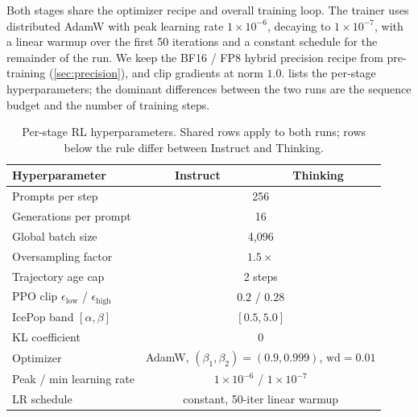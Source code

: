 \documentclass[11pt,a4paper]{article}
\newcommand{\tableheadercolor}{}
\begin{document}
Both stages share the optimizer recipe and overall training loop. The
trainer uses distributed AdamW with peak learning rate $1\!\times\!10^{-6}$,
decaying to $1\!\times\!10^{-7}$, with a linear warmup over the first
50 iterations and a constant schedule for the remainder of the run. We
keep the BF16 / FP8 hybrid precision recipe from pre-training
(\cref{sec:precision}), and clip gradients at norm $1.0$.
 lists the per-stage hyperparameters; the
dominant differences between the two runs are the sequence budget and
the number of training steps.

\begin{table}[H]
  \centering
  \caption{Per-stage RL hyperparameters. Shared rows apply to both
  runs; rows below the rule differ between Instruct and Thinking.}
  \label{tab:rl-hparams}
  \small
  \begin{tabular}{@{}lcc@{}}
    \toprule
    \tableheadercolor
    \textbf{Hyperparameter} & \textbf{Instruct} & \textbf{Thinking} \\
    \midrule
    Prompts per step                                          & \multicolumn{2}{c}{256} \\
    Generations per prompt                                    & \multicolumn{2}{c}{16} \\
    Global batch size                                         & \multicolumn{2}{c}{4{,}096} \\
    Oversampling factor                                       & \multicolumn{2}{c}{$1.5\times$} \\
    Trajectory age cap                                        & \multicolumn{2}{c}{2 steps} \\
    PPO clip $\epsilon_\text{low}$ / $\epsilon_\text{high}$    & \multicolumn{2}{c}{$0.2$ / $0.28$} \\
    IcePop band $[\alpha, \beta]$                             & \multicolumn{2}{c}{$[0.5, 5.0]$} \\
    KL coefficient                                            & \multicolumn{2}{c}{$0$} \\
    Optimizer                                                 & \multicolumn{2}{c}{AdamW, $(\beta_1, \beta_2) = (0.9, 0.999)$, $\text{wd} = 0.01$} \\
    Peak / min learning rate                                  & \multicolumn{2}{c}{$1\!\times\!10^{-6}$ / $1\!\times\!10^{-7}$} \\
    LR schedule                                               & \multicolumn{2}{c}{constant, 50-iter linear warmup} \\

\end{tabular}
\end{table}
\end{document}
